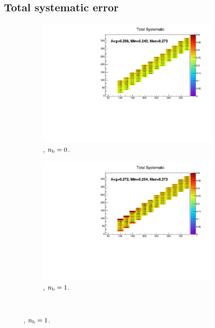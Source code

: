 \newpage
\subsection*{Total systematic error}

\begin{figure}[h!]
  \centering
  \begin{subfigure}[b]{0.47\textwidth}
    \includegraphics[width=\textwidth]{Figs/sms/t2degen/v19/systs/total_T2_4body_eq0b_le3j_incl.pdf}
    \caption{\njlow, $n_{\text{b}} = 0$.}
  \end{subfigure}
  \begin{subfigure}[b]{0.47\textwidth}
    \includegraphics[width=\textwidth]{Figs/sms/t2degen/v19/systs/total_T2_4body_eq1b_le3j_incl.pdf}
    \caption{\njlow, $n_{\text{b}} = 1$.}
  \end{subfigure}\\

\end{figure}
